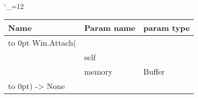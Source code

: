 \begingroup \catcode`\_=12 \tt
\begin{tabular}{lll}
\toprule
\textrm{Name}&\textrm{Param name}&\textrm{param type}\\
\midrule
\hbox to 0pt {Win.Attach(\hss}\\
& self\\
& memory & Buffer\\
\hbox to 0pt{) -> None\hss}\\
\bottomrule
\end{tabular}
\endgroup
